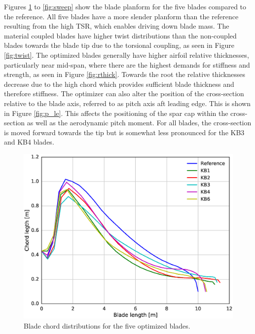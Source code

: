 Figures \ref{fig:chord} to \ref{fig:sweep} show the blade planform for the five blades compared to the reference.
All five blades have a more slender planform than the reference resulting from the high TSR, which enables driving down blade mass.
The material coupled blades have higher twist distributions than the non-coupled blades towards the blade tip due to the torsional coupling, as seen in Figure \ref{fig:twist}. 
The optimized blades generally have higher airfoil relative thicknesses, particularly near mid-span, where there are the highest demands for stiffness and strength, as seen in Figure \ref{fig:rthick}. Towards the root the relative thicknesses decrease due to the high chord which provides sufficient blade thickness and therefore stiffness.
The optimizer can also alter the position of the cross-section relative to the blade axis, referred to as pitch axis aft leading edge. This is shown in Figure \ref{fig:p_le}. This affects the positioning of the spar cap within the cross-section as well as the aerodynamic pitch moment.
For all blades, the cross-section is moved forward towards the tip but is somewhat less pronounced for the KB3 and KB4 blades. 

\begin{figure}[!ht]
\begin{center}
	\includegraphics[width=.85\linewidth]{figures/KBcomp_chord.eps}
\end{center}
\caption{Blade chord distributions for the five optimized blades.}
\label{fig:chord}
\end{figure}


